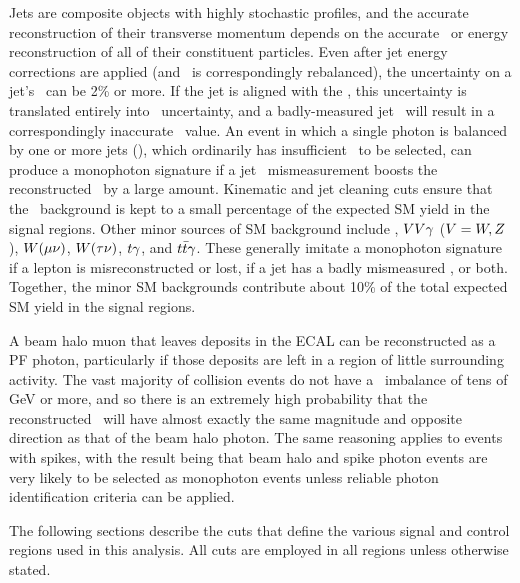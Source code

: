 Jets are composite objects with highly stochastic profiles, and the accurate reconstruction of their transverse momentum depends on the accurate \pT\ or energy reconstruction
of all of their constituent particles. Even after jet energy corrections are applied (and \vecMET\ is correspondingly
rebalanced), the uncertainty on a jet's \pT\ can be 2\% or more. If the jet is aligned with the \vecMET, this uncertainty is translated entirely into \MET\ uncertainty,
and a badly-measured jet \pT\ will result in a correspondingly inaccurate \MET\ value. An event in which a single photon is balanced by one or more jets (\gjets), which ordinarily has
insufficient \MET\ to be selected, can produce a monophoton signature if a jet \pT\ mismeasurement boosts the reconstructed \MET\ by a large amount. Kinematic and jet
cleaning cuts ensure that the \gjets\ background is kept to a small percentage of the expected SM yield in the signal regions.
Other minor sources of SM background include \zllg, $VV\gamma$ ($V = W,Z$), $W(\mu\nu)$, $W(\tau\nu)$, $t\gamma$, and $t\bar{t}\gamma$. These generally imitate
a monophoton signature if a lepton is misreconstructed or lost, if a jet has a badly mismeasured \pT, or both. Together, the minor SM backgrounds contribute about 10\% of the total
expected SM yield in the signal regions.

A beam halo muon that leaves deposits in the ECAL can be reconstructed as a PF photon, particularly if those deposits are left in a region of little surrounding activity.
The vast majority of collision events do not have a \pT\ imbalance of tens of \unit{GeV} or more, and so there is an extremely high probability that the reconstructed \MET\ will
have almost exactly the same magnitude and opposite direction as that of the beam halo photon. The same reasoning applies to events with spikes, with the result being that beam
halo and spike photon events are very likely to be selected as monophoton events unless reliable photon identification criteria can be applied.

The following sections describe the cuts that define the various signal and control regions used in this analysis. All cuts are employed in all regions unless
otherwise stated.

